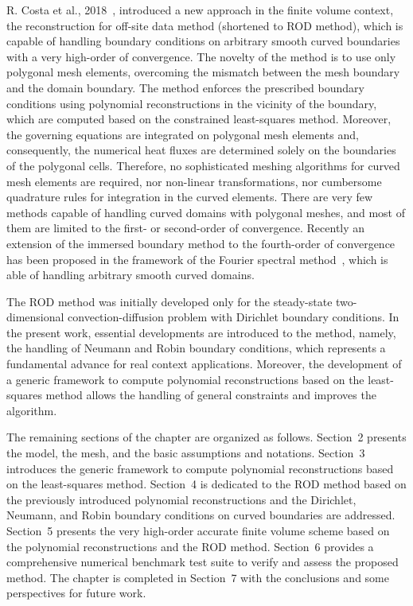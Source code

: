 R. Costa et al., 2018~\cite{chap2:2018costa1}, introduced a new approach in the finite volume context, the reconstruction for off-site data method (shortened to ROD method), which is capable of handling boundary conditions on arbitrary smooth curved boundaries with a very high-order of convergence.
The novelty of the method is to use only polygonal mesh elements, overcoming the mismatch between the mesh boundary and the domain boundary.
The method enforces the prescribed boundary conditions using polynomial reconstructions in the vicinity of the boundary, which are computed based on the constrained least-squares method.
Moreover, the governing equations are integrated on polygonal mesh elements and, consequently, the numerical heat fluxes are determined solely on the boundaries of the polygonal cells.
Therefore, no sophisticated meshing algorithms for curved mesh elements are required, nor non-linear transformations, nor cumbersome quadrature rules for integration in the curved elements.
There are very few methods capable of handling curved domains with polygonal meshes, and most of them are limited to the first- or second-order of convergence.
Recently an extension of the immersed boundary method to the fourth-order of convergence has been proposed in the framework of the Fourier spectral method~\cite{chap2:2016stein,chap2:2017stein}, which is able of handling arbitrary smooth curved domains.

The ROD method was initially developed only for the steady-state two-dimensional convection-diffusion problem with Dirichlet boundary conditions.
In the present work, essential developments are introduced to the method, namely, the handling of Neumann and Robin boundary conditions, which represents a fundamental advance for real context applications.
Moreover, the development of a generic framework to compute polynomial reconstructions based on the least-squares method allows the handling of general constraints and improves the algorithm.

The remaining sections of the chapter are organized as follows.
Section~2 presents the model, the mesh, and the basic assumptions and notations.
Section~3 introduces the generic framework to compute polynomial reconstructions based on the least-squares method.
Section~4 is dedicated to the ROD method based on the previously introduced polynomial reconstructions and the Dirichlet, Neumann, and Robin boundary conditions on curved boundaries are addressed.
Section~5 presents the very high-order accurate finite volume scheme based on the polynomial reconstructions and the ROD method.
Section~6 provides a comprehensive numerical benchmark test suite to verify and assess the proposed method.
The chapter is completed in Section~7 with the conclusions and some perspectives for future work.

